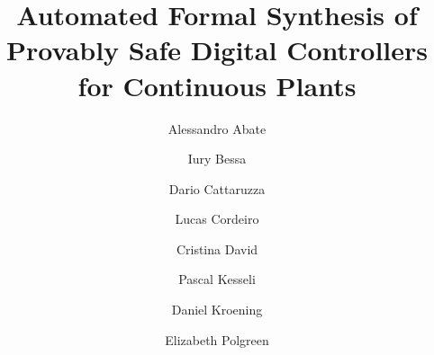 \usepackage{url}

\newcommand{\addtodo}[1]{\textcolor{red}{[#1]}}
\newcommand{\mat}[1]{{#1}}
\renewcommand{\vec}[1]{{#1}}
\newcommand{\comment}[1]{}

\newcommand{\xmark}{\ding{55}}

\renewcommand{\note}[1]{\textcolor{red}{[#1]}}
\newcommand{\reply}[1]{\textcolor{blue}{[#1]}}


\newcommand\tool{{\sf DSSynth}}


\title{Automated Formal Synthesis 
of Provably Safe Digital Controllers 
for Continuous Plants}


\author{Alessandro Abate         \and
        Iury Bessa \and
        Dario Cattaruzza \and
        Lucas Cordeiro \and
        Cristina David \and
        Pascal Kesseli \and
        Daniel Kroening \and
        Elizabeth Polgreen
}



\institute{}



%


